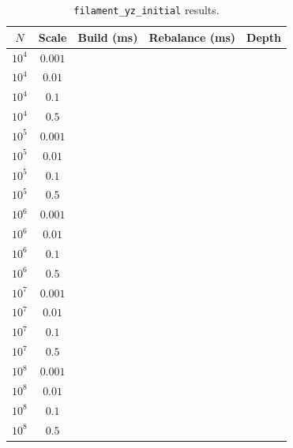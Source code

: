 \begin{table}[ht]
    \centering
    \caption{\texttt{filament\_yz\_initial} results.}
    \label{tab:filament_yz_results}
    \begin{tabular}{|c|c|c|c|c|}
        \hline
        \textbf{$N$} & \textbf{Scale} & \textbf{Build (ms)} & \textbf{Rebalance (ms)} & \textbf{Depth} \\
        \hline
        $10^4$ & $0.001$ & & & \\
        $10^4$ & $0.01$  & & & \\
        $10^4$ & $0.1$   & & & \\
        $10^4$ & $0.5$   & & & \\
        \hline
        $10^5$ & $0.001$ & & & \\
        $10^5$ & $0.01$  & & & \\
        $10^5$ & $0.1$   & & & \\
        $10^5$ & $0.5$   & & & \\
        \hline
        $10^6$ & $0.001$ & & & \\
        $10^6$ & $0.01$  & & & \\
        $10^6$ & $0.1$   & & & \\
        $10^6$ & $0.5$   & & & \\
        \hline
        $10^7$ & $0.001$ & & & \\
        $10^7$ & $0.01$  & & & \\
        $10^7$ & $0.1$   & & & \\
        $10^7$ & $0.5$   & & & \\
        \hline
        $10^8$ & $0.001$ & & & \\
        $10^8$ & $0.01$  & & & \\
        $10^8$ & $0.1$   & & & \\
        $10^8$ & $0.5$   & & & \\
        \hline
    \end{tabular}
\end{table}

